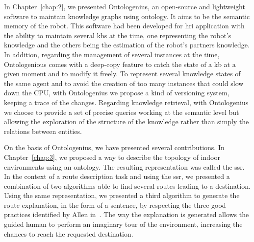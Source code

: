 In Chapter~\ref{chap:2}, we presented Ontologenius, an open-source and lightweight software to maintain knowledge graphs using ontology. It aims to be the semantic memory of the robot. This software had been developed for \acrshort{hri} application with the ability to maintain several \acrlong{kb}s at the time, one representing the robot's knowledge and the others being the estimation of the robot's partners knowledge. In addition, regarding the management of several instances at the time, Ontologenious comes with a deep-copy feature to catch the state of a \acrshort{kb} at a given moment and to modify it freely. To represent several knowledge states of the same agent and to avoid the creation of too many instances that could slow down the CPU, with Ontologenius we propose a kind of versioning system, keeping a trace of the changes. Regarding knowledge retrieval, with Ontologenius we choose to provide a set of precise queries working at the semantic level but allowing the exploration of the structure of the knowledge rather than simply the relations between entities.

On the basis of Ontologenius, we have presented several contributions. In Chapter~\ref{chap:3}, we proposed a way to describe the topology of indoor environments using an ontology. The resulting representation was called the \acrfull{ssr}. In the context of a route description task and using the \acrshort{ssr}, we presented a combination of two algorithms able to find several routes leading to a destination. Using the same representation, we presented a third algorithm to generate the route explanation, in the form of a sentence, by respecting the three good practices identified by Allen in~\cite{allen_2000_principles}. The way the explanation is generated allows the guided human to perform an imaginary tour of the environment, increasing the chances to reach the requested destination.

